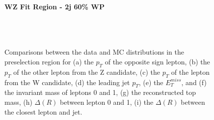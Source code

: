 \begin{figure}[H] 
    \centering
    \textbf{WZ Fit Region - 2j 60\% WP}\\
    \\
    \\
    \\
    \caption{Comparisons between the data and MC distributions in the preselection region for (a) the $p_T$ of the opposite sign lepton, (b) the $p_T$ of the other lepton from the Z candidate, (c) the $p_T$ of the lepton from the W candidate, (d) the leading jet $p_T$, (e) the $E_T^{miss}$, and (f) the invariant mass of leptons 0 and 1, (g) the reconstructed top mass, (h) $\Delta(R)$ between lepton 0 and 1, (i) the $\Delta(R)$ between the closest lepton and jet.}
    \label{kin:WP_2j_60}
\end{figure}

